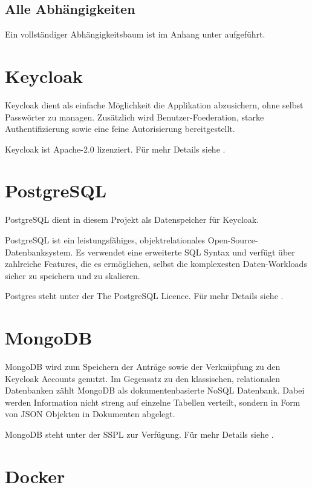 \subsection{Alle Abhängigkeiten}
Ein vollständiger Abhängigkeitsbaum ist im Anhang unter  aufgeführt.

\section{Keycloak}\label{sec:keycloak}

Keycloak dient als einfache Möglichkeit die Applikation abzusichern, ohne selbst Passwörter zu managen.
Zusätzlich wird \gls{Benutzer-Foederation}, starke Authentifizierung sowie eine feine Autorisierung bereitgestellt.
\cite{about-keycloak}

Keycloak ist Apache-2.0 lizenziert.
Für mehr Details siehe .

\section{PostgreSQL}\label{sec:postgres}

PostgreSQL dient in diesem Projekt als Datenspeicher für Keycloak.

PostgreSQL ist ein leistungsfähiges, objektrelationales Open-Source-Datenbanksystem.
Es verwendet eine erweiterte \ac{SQL} Syntax und verfügt über zahlreiche Features,
die es ermöglichen, selbst die komplexesten Daten-Workloads sicher zu speichern und zu skalieren.
\cite{about-postgres}

Postgres steht unter der The PostgreSQL Licence.
Für mehr Details siehe .


\section{MongoDB}\label{sec:mongodb}

MongoDB wird zum Speichern der Anträge sowie der Verknüpfung zu den Keycloak Accounts genutzt.
Im Gegensatz zu den klassischen, relationalen Datenbanken zählt MongoDB als dokumentenbasierte NoSQL Datenbank.
Dabei werden Information nicht streng auf einzelne Tabellen verteilt, sondern in Form von \ac{JSON} Objekten in Dokumenten abgelegt.

MongoDB steht unter der \acl{SSPL} zur Verfügung.
Für mehr Details siehe .

\section{Docker}\label{sec:docker}

